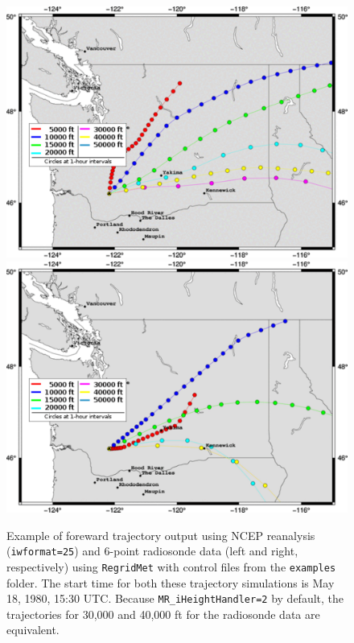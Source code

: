 \documentclass[11pt]{article}   %
\begin{document}
\begin{figure}[htbp]\begin{center}
 \includegraphics[angle=0,scale=0.3]{Figs/trajectory_NCEP.pdf}
 \includegraphics[angle=0,scale=0.3]{Figs/trajectory_Sonde.pdf}
 \parbox{15cm}{\caption{\label{FigTraj}
 Example of foreward trajectory output using NCEP reanalysis (\texttt{iwformat=25}) and
 6-point radiosonde data (left and right, respectively) using \texttt{RegridMet} with control files
 from the \texttt{examples} folder.  The start time for both these trajectory simulations is
 May 18, 1980, 15:30 UTC. Because \texttt{MR\_iHeightHandler=2} by default, the trajectories for 30,000
 and 40,000 ft for the radiosonde data are equivalent.
 }}
 \end{center}\end{figure}
\end{document}
